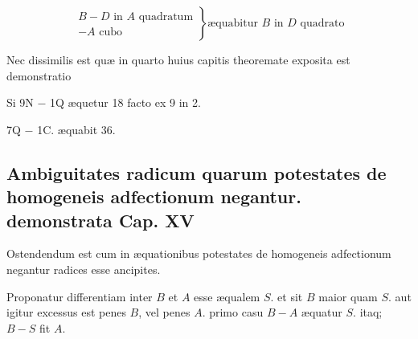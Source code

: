 \documentclass[11pt,a4paper]{article}
\begin{document}
\[ \left.\begin{array}{l} B - D \text{ in } A \text{ quadratum} \\ - A \text{ cubo} \end{array}\right\} \text{æquabitur } B \text{ in } D \text{ quadrato} \]

Nec dissimilis est quæ in quarto huius capitis theoremate exposita est demonstratio


Si 9N $-$ 1Q æquetur 18 facto ex 9 in 2.

7Q $-$ 1C. æquabit 36.

\subsection*{Ambiguitates radicum quarum potestates de homogeneis adfectionum  negantur. demonstrata Cap.  XV}

Ostendendum est cum in æquationibus potestates de homogeneis adfectionum negantur radices esse ancipites.

Proponatur differentiam inter $B$ et $A$ esse æqualem $S$. et sit $B$ maior quam $S$. aut igitur excessus est penes $B$, vel penes $A$. primo casu $B - A$ æquatur $S$. itaq; $B - S$ fit $A$.
\end{document}
